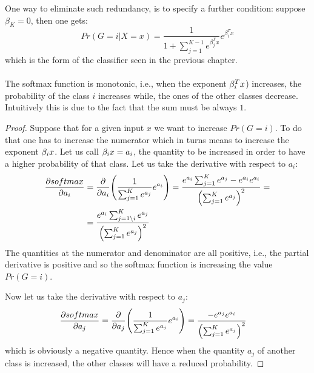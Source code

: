 One way to eliminate such redundancy, is to specify a further condition: suppose $\beta_K = 0$, then one gets:
\begin{equation}
Pr\left(G=i|X=x\right) = \frac{1}{1+\sum_{j=1}^{K-1} e^{\beta_j ^T x}}e^{\beta_i ^T x }
\end{equation}
which is the form of the classifier seen in the previous chapter.

\paragraph{} The softmax function is monotonic, i.e., when the exponent $\mathbf{\beta}_i^T x$) increases, the probability of the class $i$ increases while, the ones of the other classes decrease. Intuitively this is due to the fact that the sum must be always $1$.
\begin{proof}
Suppose that for a given input $x$ we want to increase $Pr(G=i)$. To do that one has to increase the numerator which in turns means to increase the exponent $\mathbf{\beta}_i x$. Let us call $\mathbf{\beta}_i x = a_i$, the quantity to be increased in order to have a higher probability of that class. Let us take the derivative with respect to $a_i$:
\begin{equation}
\begin{aligned}
\frac{\partial softmax}{\pr a_i} &=\frac{\partial }{\pr a_i}  \br{\frac{1}{\sum_{j=1}^Ke^{a_j}}e^{a_i} } =\frac{e^{a_i} \sum_{j=1}^Ke^{a_j} - e^{a_i} e^{a_i} } {\br{\sum_{j=1}^Ke^{a_j}}^2} = \\
&=\frac{e^{a_i} \sum_{j=1\setminus i}^Ke^{a_j} }{\br{\sum_{j=1}^Ke^{a_j}}^2} \\
\end{aligned}
\end{equation}
The quantities at the numerator and denominator are all positive, i.e., the partial derivative is positive and so the softmax function is increasing the value $Pr(G=i)$.

Now let us take the derivative with respect to $a_j$:
\begin{equation}
\begin{aligned}
\frac{\partial softmax}{\pr a_j} &=\frac{\partial }{\pr a_j}  \br{\frac{1}{\sum_{j=1}^Ke^{a_j}}e^{a_i} }=\frac{-e^{a_j} e^{a_i} } {\br{\sum_{j=1}^Ke^{a_j}}^2}
\end{aligned}
\end{equation}
which is obviously a negative quantity. Hence when the quantity $a_j$ of another class is increased, the other classes will have a reduced probability.
\end{proof}

